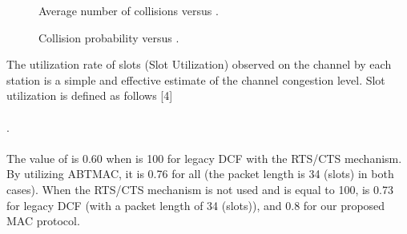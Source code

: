 \documentclass[10pt,twocolumn,oneside,submit]{JCNtran}
\begin{document}
\begin{figure}[h!tb]
\begin{center}
\epsfxsize=8cm \leavevmode{} \caption{Average number of collisions versus .} \label{fig:10}
\end{center}
\end{figure}
\begin{figure}[h!tb]
\begin{center}
\epsfxsize=8cm \leavevmode{} \caption{Collision probability versus .} \label{fig:11}
\end{center}
\end{figure}
\par The utilization rate of slots (Slot Utilization) observed on the channel by each station is a simple and effective estimate of the channel congestion level. Slot utilization is defined as follows [4]\\
\\
.\\
\\
The value of  is 0.60 when  is 100 for legacy DCF with the RTS/CTS mechanism. By utilizing ABTMAC, it is 0.76 for all  (the packet length is 34 (slots) in both cases). When the RTS/CTS mechanism is not used and  is equal to 100,  is 0.73 for legacy DCF (with a packet length of 34 (slots)), and 0.8 for our proposed MAC protocol.
\end{document}
